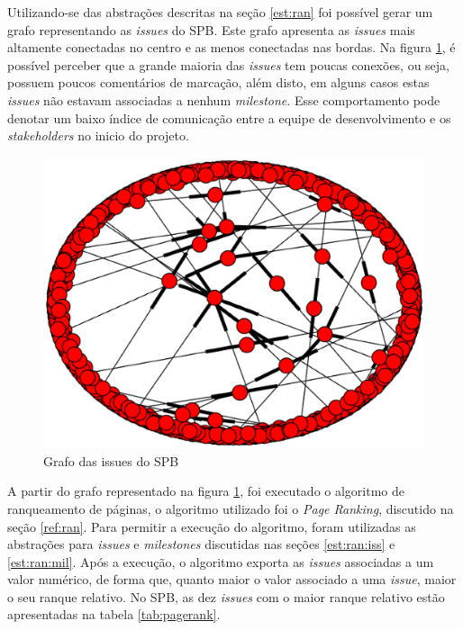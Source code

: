 Utilizando-se das abstrações descritas na seção \ref{est:ran} foi possível gerar um grafo representando as \textit{issues} do SPB. Este grafo apresenta as \textit{issues} mais altamente conectadas no centro e as menos conectadas nas bordas. Na figura \ref{fig:graph}, é possível perceber que a grande maioria das \textit{issues} tem poucas conexões, ou seja, possuem poucos comentários de marcação, além disto, em alguns casos estas \textit{issues} não estavam associadas a nenhum \textit{milestone}. Esse comportamento pode denotar um baixo índice de comunicação entre a equipe de desenvolvimento e os \textit{stakeholders} no inicio do projeto.

\begin{figure}[h]
    \centering
        \includegraphics[keepaspectratio=true,scale=0.5]{figuras/graph.eps}
    \caption{Grafo das issues do SPB}
    \label{fig:graph}
\end{figure}

A partir do grafo representado na figura \ref{fig:graph}, foi executado o algoritmo de ranqueamento de páginas, o algoritmo utilizado foi o \textit{Page Ranking}, discutido na seção \ref{ref:ran}. Para permitir a execução do algoritmo, foram utilizadas as abstrações para \textit{issues} e \textit{milestones} discutidas nas seções \ref{est:ran:iss} e \ref{est:ran:mil}. Após a execução, o algoritmo exporta as \textit{issues} associadas a um valor numérico, de forma que, quanto maior o valor associado a uma \textit{issue}, maior o seu ranque relativo. No SPB, as dez \textit{issues} com o maior ranque relativo estão apresentadas na tabela \ref{tab:pagerank}. 

